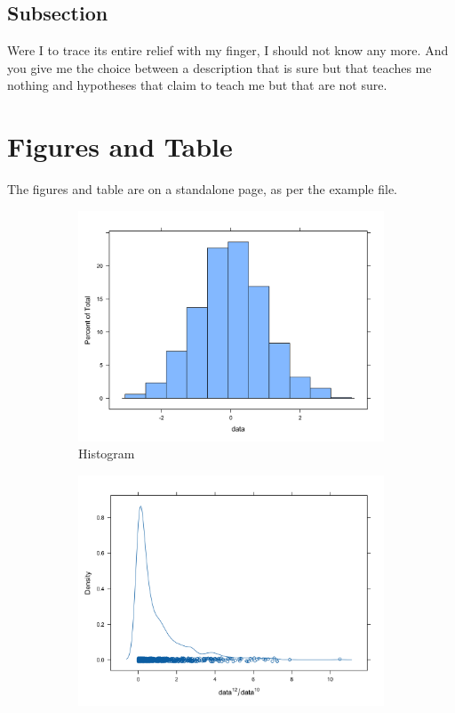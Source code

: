 \documentclass[12pt]{article}
\begin{document}
\subsection{Subsection}
Were I to trace its entire relief with my finger, I should not know any more. And you give me the choice between a description that is sure but that teaches me nothing and hypotheses that claim to teach me but that are not sure.

\section{Figures and Table}
The figures and table are on a standalone page, as per the example file.

\vspace{6cm}

\begin{figure}[t]
\centering
\begin{subfigure}{0.48\textwidth}
    \includegraphics[width=\textwidth]{hist.jpg}
    \caption{Histogram}
    \label{histogram}
\end{subfigure}
\hfill
\begin{subfigure}{0.48\textwidth}
    \includegraphics[width=\textwidth]{density.jpg}

\end{subfigure}
\end{figure}
\end{document}
